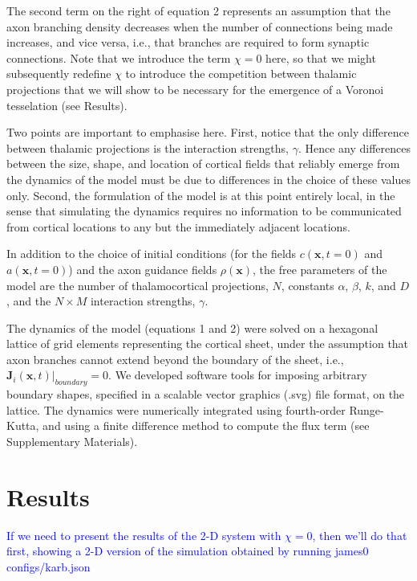 \documentclass[a4paper,11pt]{article}
\newcommand{\cmnt}[1]{\textcolor{blue}{#1}}
\newcommand{\code}[1]{\textsf{#1}}
\newcommand{\mb}[1]{\mathbf{#1}}
\begin{document}
The second term on the right of equation 2 represents an assumption that the
axon branching density decreases when the number of connections being made
increases, and vice versa, i.e., that branches are required to form synaptic
connections. Note that we introduce the term $\chi=0$ here, so that we might
subsequently redefine $\chi$ to introduce the competition between thalamic
projections that we will show to be necessary for the emergence of a Voronoi
tesselation (see Results).

Two points are important to emphasise here. First, notice that the only
difference between thalamic projections is the interaction strengths,
$\gamma$. Hence any differences between the size, shape, and location of
cortical fields that reliably emerge from the dynamics of the model must be
due to differences in the choice of these values only. Second, the formulation
of the model is at this point entirely local, in the sense that simulating the
dynamics requires no information to be communicated from cortical locations to
any but the immediately adjacent locations.

In addition to the choice of initial conditions (for the fields
$c(\mb{x},t=0)$ and $a(\mb{x},t=0)$) and the axon guidance fields
$\rho(\mb{x})$, the free parameters of the model are the number of
thalamocortical projections, $N$, constants $\alpha$, $\beta$, $k$, and $D$,
and the $N\times M$ interaction strengths, $\gamma$.

The dynamics of the model (equations 1 and 2) were solved on a hexagonal
lattice of grid elements representing the cortical sheet, under the assumption
that axon branches cannot extend beyond the boundary of the sheet, i.e.,
$\mb{J}_i(\mb{x},t) \bigg\rvert_{boundary} = 0$. We developed software tools
for imposing arbitrary boundary shapes, specified in a scalable vector
graphics (.svg) file format, on the lattice. The dynamics were numerically
integrated using fourth-order Runge-Kutta, and using a {\color{red} finite
  difference method} to compute the flux term (see Supplementary Materials).

\section*{Results}

\cmnt{If we need to present the results of the 2-D system with $\chi=0$, then
  we'll do that first, showing a 2-D version of the simulation obtained by
  running \code{james0 configs/karb.json}}
\end{document}
